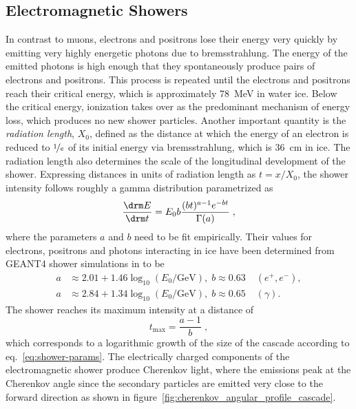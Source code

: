 \subsection{Electromagnetic Showers}
\label{sec:em-showers}
In contrast to muons, electrons and positrons lose their energy very quickly by emitting very highly energetic photons due to bremsstrahlung.
The energy of the emitted photons is high enough that they spontaneously produce pairs of electrons and positrons.
This process is repeated until the electrons and positrons reach their critical energy, which is approximately 78~MeV in water ice.
Below the critical energy, ionization takes over as the predominant mechanism of energy loss, which produces no new shower particles.
Another important quantity is the \emph{radiation length}, $X_0$, defined as the distance at which the energy of an electron is reduced to $\nicefrac{1}{e}$ of its initial energy via bremsstrahlung, which is 36~cm in ice\cite{pdg}.
The radiation length also determines the scale of the longitudinal development of the shower.
Expressing distances in units of radiation length as $t=x/X_0$, the shower intensity follows roughly a gamma distribution parametrized as
\begin{equation}
    \frac{\drm E}{\drm t} = E_0 b \frac{(bt)^{a-1}e^{-bt}}{\Gamma(a)}\;,
\end{equation}
where the parameters $a$ and $b$ need to be fit empirically\cite{pdg}.
Their values for electrons, positrons and photons interacting in ice have been determined from GEANT4 shower simulations in to be
\begin{align}
    a &\approx 2.01 + 1.46 \log_{10}(E_0/\mathrm{GeV}),\; b\approx 0.63\; & (e^+,e^-), \\
    a &\approx 2.84 + 1.34 \log_{10}(E_0/\mathrm{GeV}),\; b\approx 0.65\; & (\gamma).\label{eq:shower-params}
\end{align}
The shower reaches its maximum intensity at a distance of
\begin{equation}
    t_{\mathrm{max}}=\frac{a-1}{b}\;,
\end{equation}
which corresponds to a logarithmic growth of the size of the cascade according to eq.~\ref{eq:shower-params}.
The electrically charged components of the electromagnetic shower produce Cherenkov light, where the emissions peak at the Cherenkov angle since the secondary particles are emitted very close to the forward direction as shown in figure~\ref{fig:cherenkov_angular_profile_cascade}.

